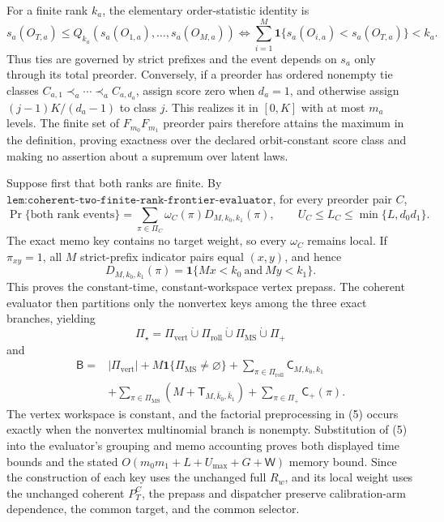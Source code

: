 For a finite rank \(k_a\), the elementary order-statistic identity is
\[
s_a(O_{T,a})\le Q_{k_a}(s_a(O_{1,a}),\ldots,s_a(O_{M,a}))
\iff
\sum_{i=1}^M\mathbf 1\{s_a(O_{i,a})<s_a(O_{T,a})\}<k_a.
\tag{1}
\]
Thus ties are governed by strict prefixes and the event depends on \(s_a\) only through its total preorder. Conversely, if a preorder has ordered nonempty tie classes \(C_{a,1}\prec_a\cdots\prec_a C_{a,d_a}\), assign score zero when \(d_a=1\), and otherwise assign \((j-1)K/(d_a-1)\) to class \(j\). This realizes it in \([0,K]\) with at most \(m_a\) levels. The finite set of \(F_{m_0}F_{m_1}\) preorder pairs therefore attains the maximum in the definition, proving exactness over the declared orbit-constant score class and making no assertion about a supremum over latent laws.

Suppose first that both ranks are finite. By \(\texttt{lem:coherent-two-finite-rank-frontier-evaluator}\), for every preorder pair \(C\),
\[
\Pr\{\text{both rank events}\}
=\sum_{\pi\in\Pi_C}\omega_C(\pi)D_{M,k_0,k_1}(\pi),
\qquad U_C\le L_C\le\min\{L,d_0d_1\}.
\tag{2}
\]
The exact memo key contains no target weight, so every \(\omega_C\) remains local. If \(\pi_{xy}=1\), all \(M\) strict-prefix indicator pairs equal \((x,y)\), and hence
\[
D_{M,k_0,k_1}(\pi)=\mathbf 1\{Mx<k_0\ \text{and}\ My<k_1\}.
\tag{3}
\]
This proves the constant-time, constant-workspace vertex prepass. The coherent evaluator then partitions only the nonvertex keys among the three exact branches, yielding
\[
\Pi_\star=\Pi_{\mathrm{vert}}\mathbin{\dot\cup}\Pi_{\mathrm{roll}}\mathbin{\dot\cup}\Pi_{\mathrm{MS}}\mathbin{\dot\cup}\Pi_+
\tag{4}
\]
and
\[
\begin{aligned}
\mathsf B={}&|\Pi_{\mathrm{vert}}|+M\mathbf 1\{\Pi_{\mathrm{MS}}\ne\varnothing\}
+\sum_{\pi\in\Pi_{\mathrm{roll}}}\mathsf C_{M,k_0,k_1}\\
&+\sum_{\pi\in\Pi_{\mathrm{MS}}}(M+\mathsf T_{M,\bar k_0,\bar k_1})
+\sum_{\pi\in\Pi_+}\mathsf C_+(\pi).
\end{aligned}
\tag{5}
\]
The vertex workspace is constant, and the factorial preprocessing in (5) occurs exactly when the nonvertex multinomial branch is nonempty. Substitution of (5) into the evaluator's grouping and memo accounting proves both displayed time bounds and the stated \(O(m_0m_1+L+U_{\max}+G+\mathsf W)\) memory bound. Since the construction of each key uses the unchanged full \(R_w\), and its local weight uses the unchanged coherent \(P_T^C\), the prepass and dispatcher preserve calibration-arm dependence, the common target, and the common selector.

